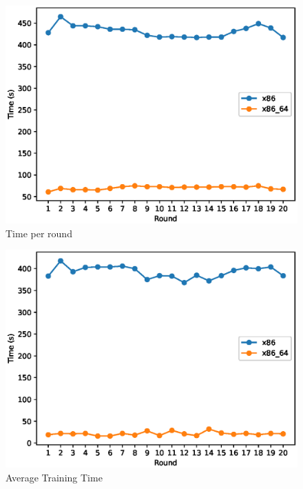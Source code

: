 \documentclass[12pt]{article}
\begin{document}
\begin{figure}
  \includegraphics[width=\linewidth]{round-time}
  \caption{Time per round}
  \label{fig:round}
\end{figure}

\begin{figure}
  \includegraphics[width=\linewidth]{avg-training}
  \caption{Average Training Time}
  \label{fig:training_time}
\end{figure}
\end{document}
